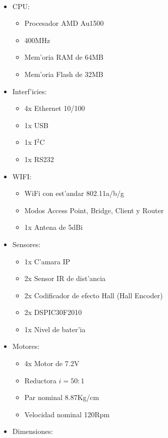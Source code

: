 \documentclass[twoside,12pt]{article}
\begin{document}
\paragraph*{}
\begin{multicols}{2}
\begin{itemize}
\item CPU:
	\begin{itemize}
	\item Procesador AMD Au1500
	\item 400MHz
	\item Mem'oria RAM de 64MB
	\item Mem'oria Flash de 32MB
	\end{itemize}
\item Interf'icies:
	\begin{itemize}
	\item 4x Ethernet 10/100
	\item 1x USB
	\item 1x I$^{2}$C
	\item 1x RS232
	\end{itemize}
\item WIFI:
	\begin{itemize}
	\item WiFi con est'andar 802.11a/b/g
	\item Modos Access Point, Bridge, Client y Router
	\item 1x Antena de 5dBi
	\end{itemize}
\item Sensores:
	\begin{itemize}
	\item 1x C'amara IP
	\item 2x Sensor IR de dist'ancia
	\item 2x Codificador de efecto Hall (Hall Encoder) 
	\item 2x DSPIC30F2010
	\item 1x Nivel de bater'ia
	\end{itemize}
\item Motores:
	\begin{itemize}
	\item 4x Motor de 7.2V
	\item Reductora $i=50:1$
	\item Par nominal 8.87Kg/cm
	\item Velocidad nominal 120Rpm
	\end{itemize}
\item Dimensiones:
	\begin{itemize}

\end{itemize}
\end{itemize}
\end{multicols}
\end{document}
